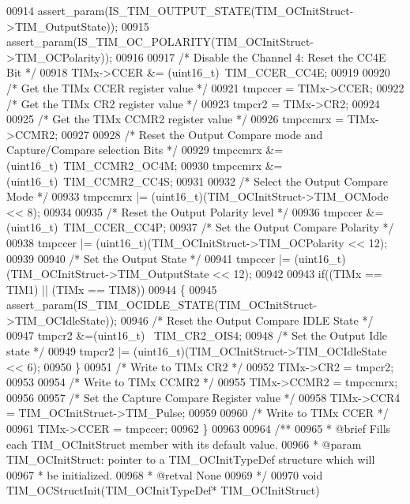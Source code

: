 \begin{DoxyCode}
00914   assert_param(IS\_TIM\_OUTPUT\_STATE(TIM\_OCInitStruct->TIM\_OutputState));
00915   assert_param(IS\_TIM\_OC\_POLARITY(TIM\_OCInitStruct->TIM\_OCPolarity));
00916 
00917   \textcolor{comment}{/* Disable the Channel 4: Reset the CC4E Bit */}
00918   TIMx->CCER &= (uint16\_t)~TIM_CCER_CC4E;
00919 
00920   \textcolor{comment}{/* Get the TIMx CCER register value */}
00921   tmpccer = TIMx->CCER;
00922   \textcolor{comment}{/* Get the TIMx CR2 register value */}
00923   tmpcr2 =  TIMx->CR2;
00924 
00925   \textcolor{comment}{/* Get the TIMx CCMR2 register value */}
00926   tmpccmrx = TIMx->CCMR2;
00927 
00928   \textcolor{comment}{/* Reset the Output Compare mode and Capture/Compare selection Bits */}
00929   tmpccmrx &= (uint16\_t)~TIM_CCMR2_OC4M;
00930   tmpccmrx &= (uint16\_t)~TIM_CCMR2_CC4S;
00931 
00932   \textcolor{comment}{/* Select the Output Compare Mode */}
00933   tmpccmrx |= (uint16\_t)(TIM\_OCInitStruct->TIM_OCMode << 8);
00934 
00935   \textcolor{comment}{/* Reset the Output Polarity level */}
00936   tmpccer &= (uint16\_t)~TIM_CCER_CC4P;
00937   \textcolor{comment}{/* Set the Output Compare Polarity */}
00938   tmpccer |= (uint16\_t)(TIM\_OCInitStruct->TIM_OCPolarity << 12);
00939 
00940   \textcolor{comment}{/* Set the Output State */}
00941   tmpccer |= (uint16\_t)(TIM\_OCInitStruct->TIM_OutputState << 12);
00942 
00943   \textcolor{keywordflow}{if}((TIMx == TIM1) || (TIMx == TIM8))
00944   \{
00945     assert_param(IS\_TIM\_OCIDLE\_STATE(TIM\_OCInitStruct->TIM\_OCIdleState));
00946     \textcolor{comment}{/* Reset the Output Compare IDLE State */}
00947     tmpcr2 &=(uint16\_t) ~TIM_CR2_OIS4;
00948     \textcolor{comment}{/* Set the Output Idle state */}
00949     tmpcr2 |= (uint16\_t)(TIM\_OCInitStruct->TIM_OCIdleState << 6);
00950   \}
00951   \textcolor{comment}{/* Write to TIMx CR2 */}
00952   TIMx->CR2 = tmpcr2;
00953 
00954   \textcolor{comment}{/* Write to TIMx CCMR2 */}
00955   TIMx->CCMR2 = tmpccmrx;
00956 
00957   \textcolor{comment}{/* Set the Capture Compare Register value */}
00958   TIMx->CCR4 = TIM\_OCInitStruct->TIM\_Pulse;
00959 
00960   \textcolor{comment}{/* Write to TIMx CCER */}
00961   TIMx->CCER = tmpccer;
00962 \}
00963 
00964 \textcolor{comment}{/**}
00965 \textcolor{comment}{  * @brief  Fills each TIM\_OCInitStruct member with its default value.}
00966 \textcolor{comment}{  * @param  TIM\_OCInitStruct: pointer to a TIM\_OCInitTypeDef structure which will}
00967 \textcolor{comment}{  *         be initialized.}
00968 \textcolor{comment}{  * @retval None}
00969 \textcolor{comment}{  */}
00970 \textcolor{keywordtype}{void} TIM_OCStructInit(TIM\_OCInitTypeDef* TIM\_OCInitStruct)

\end{DoxyCode}

